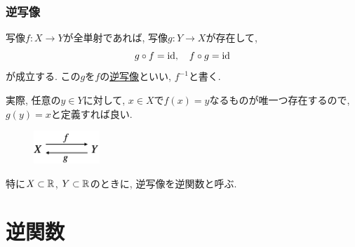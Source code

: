 \begin{frame}
\frametitle{逆写像}


\begin{Thm}
写像$f:X\rightarrow Y$が全単射であれば, 写像$g:Y\rightarrow X$が存在して, 
$$
g\circ f = \mathrm{id}, \ \ \ f \circ g = \mathrm{id}
$$
が成立する. 
この$g$を$f$の\underline{逆写像}といい, $f^{-1}$と書く. 
\end{Thm}

実際, 任意の$y \in Y$に対して, $x \in X$で$f(x)=y$なるものが唯一つ存在するので, $g(y)=x$と定義すれば良い. 
\vspace{-4mm}

 \begin{figure}[htbp]
 \begin{center} 
  \includegraphics[width=25mm]{calculus6/inverse.png}
 \end{center}
\end{figure}

\vspace{-2mm}

特に$X \subset \mathbb{R}$, $Y \subset \mathbb{R}$のときに, 逆写像を逆関数と呼ぶ. 

\end{frame}





%
%
%




\section{逆関数}

